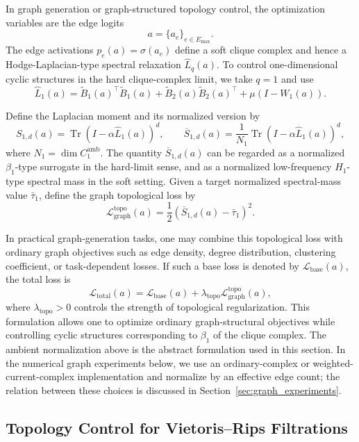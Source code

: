 \documentclass[pdflatex,sn-mathphys-ay]{sn-jnl}%
\theoremstyle{thmstyleone}%
\theoremstyle{thmstyletwo}%
\theoremstyle{thmstylethree}%
\begin{document}
In graph generation or graph-structured topology control, the optimization variables are the edge logits
\[
a=\{a_e\}_{e\in E_{\max}}.
\]
The edge activations \(p_e(a)=\sigma(a_e)\) define a soft clique complex and hence a Hodge-Laplacian-type spectral relaxation \(\widehat{L}_q(a)\).
To control one-dimensional cyclic structures in the hard clique-complex limit, we take \(q=1\) and use
\[
\widehat{L}_1(a)
=
\widetilde{B}_1(a)^\top
\widetilde{B}_1(a)
+
\widetilde{B}_2(a)
\widetilde{B}_2(a)^\top
+
\mu(I-W_1(a)).
\]

Define the Laplacian moment and its normalized version by
\[
S_{1,d}(a)
=
\operatorname{Tr}
\left(
I-\alpha\widehat{L}_1(a)
\right)^d,
\qquad
\overline{S}_{1,d}(a)
=
\frac{1}{N_1}
\operatorname{Tr}
\left(
I-\alpha\widehat{L}_1(a)
\right)^d,
\]
where \(N_1=\dim C_1^{\mathrm{amb}}\).
The quantity \(\overline{S}_{1,d}(a)\) can be regarded as a normalized \(\beta_1\)-type surrogate in the hard-limit sense, and as a normalized low-frequency \(H_1\)-type spectral mass in the soft setting.
Given a target normalized spectral-mass value \(\bar{\tau}_1\), define the graph topological loss by
\[
\mathcal{L}_{\mathrm{graph}}^{\mathrm{topo}}(a)
=
\frac{1}{2}
\left(
\overline{S}_{1,d}(a)-\bar{\tau}_1
\right)^2.
\]

In practical graph-generation tasks, one may combine this topological loss with ordinary graph objectives such as edge density, degree distribution, clustering coefficient, or task-dependent losses. If such a base loss is denoted by \(\mathcal{L}_{\mathrm{base}}(a)\), the total loss is
\[
\mathcal{L}_{\mathrm{total}}(a)
=
\mathcal{L}_{\mathrm{base}}(a)
+
\lambda_{\mathrm{topo}}
\mathcal{L}_{\mathrm{graph}}^{\mathrm{topo}}(a),
\]
where \(\lambda_{\mathrm{topo}}>0\) controls the strength of topological regularization. This formulation allows one to optimize ordinary graph-structural objectives while controlling cyclic structures corresponding to \(\beta_1\) of the clique complex.
The ambient normalization above is the abstract formulation used in this section. In the numerical graph experiments below, we use an ordinary-complex or weighted-current-complex implementation and normalize by an effective edge count; the relation between these choices is discussed in Section~\ref{sec:graph_experiments}.

\subsection{Topology Control for Vietoris--Rips Filtrations}
\end{document}
